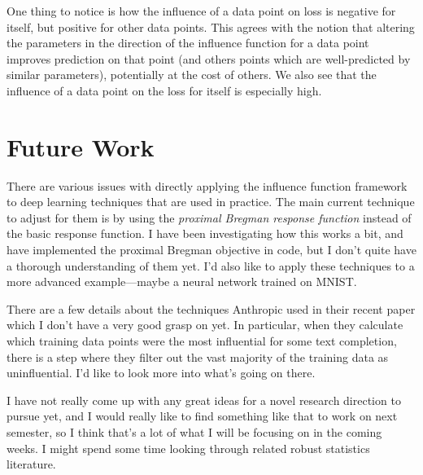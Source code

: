 \documentclass[12pt,twoside]{reedthesis}
\begin{document}
One thing to notice is how the influence of a data point on loss is negative for itself, but positive for other data points. This agrees with the notion that altering the parameters in the direction of the influence function for a data point improves prediction on that point (and others points which are well-predicted by similar parameters), potentially at the cost of others. We also see that the influence of a data point on the loss for itself is especially high.

\section{Future Work}
There are various issues with directly applying the influence function framework to deep learning techniques that are used in practice. The main current technique to adjust for them is by using the \textit{proximal Bregman response function} instead of the basic response function.\cite{bae22} I have been investigating how this works a bit, and have implemented the proximal Bregman objective in code, but I don't quite have a thorough understanding of them yet. I'd also like to apply these techniques to a more advanced example—maybe a neural network trained on MNIST.

There are a few details about the techniques Anthropic used in their recent paper which I don't have a very good grasp on yet. In particular, when they calculate which training data points were the most influential for some text completion, there is a step where they filter out the vast majority of the training data as uninfluential. I'd like to look more into what's going on there.\cite{grosse23}

I have not really come up with any great ideas for a novel research direction to pursue yet, and I would really like to find something like that to work on next semester, so I think that's a lot of what I will be focusing on in the coming weeks. I might spend some time looking through related robust statistics literature.

\end{document}
